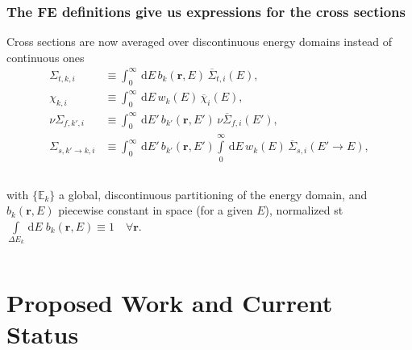 \documentclass[compress,10pt]{beamer}
\newcommand{\ud}{\,\mathrm{d}}
\renewcommand{\vec}[1]{\mathbf{#1}}
\begin{document}
\begin{frame}
\end{frame}

\typeout{***********************************************************************************}

\begin{frame}
   \frametitle{The FE definitions give us expressions for the cross sections}

   \vspace{-0.5mm}

\begin{block}{\footnotesize Cross sections are now averaged over discontinuous energy domains instead of continuous ones}
   \vspace{-3.7mm}
   \begin{align*}
\Sigma_{t,k,i} &\equiv \int_{0}^{\infty} \ud{E}\, b_{k}(\vec{r}, E) \, \overline{\Sigma}_{t,i}(E), \\
\chi_{k,i} &\equiv \int_{0}^{\infty} \ud{E}\, w_{k}(E)\, \overline{\chi}_i(E), \\
\nu \Sigma_{f,k',i} &\equiv \int_{0}^{\infty} \ud{E'}\, b_{k'}(\vec{r}, E') \,\nu\overline{\Sigma}_{f,i}(E'), \\
\Sigma_{s, k' \rightarrow k,i} &\equiv \int_{0}^{\infty} \ud{E'}\, b_{k'}(\vec{r}, E') \int\limits_{0}^{\infty} \ud{E}\, w_k(E)\, \overline{\Sigma}_{s,i}(E' \rightarrow E),
\end{align*}
%
\vspace{-1mm}
\begin{columns}
with $\{\mathbb{E}_{k}\}$ a global, discontinuous partitioning of the energy domain, and $b_{k}(\vec{r}, E)$ piecewise constant in space (for a given $E$), normalized st $\int\limits_{\Delta E_{k}} \ud{E} \;b_{k}(\vec{r}, E)\equiv 1 \quad \forall \vec{r}$.
\end{columns}


\end{block}

\end{frame}

%
\section{Proposed Work and Current Status}
\end{document}
